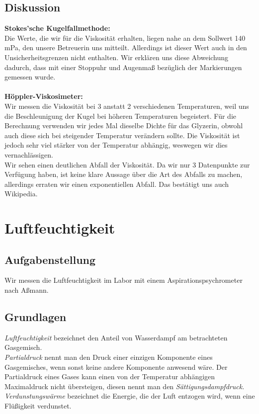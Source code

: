 \documentclass{article}
\begin{document}
\subsection{Diskussion}
\textbf{Stokes'sche Kugelfallmethode:}
\\
Die Werte, die wir für die Viskosität erhalten, liegen nahe an dem Sollwert 140 mPa, den unsere Betreuerin uns mitteilt. Allerdings ist dieser Wert auch in den Unsicherheitsgrenzen nicht enthalten. Wir erklären uns diese Abweichung dadurch, dass mit einer Stoppuhr und Augenmaß bezüglich der Markierungen gemessen wurde.\\
\\
\textbf{Höppler-Viskosimeter:}\\
Wir messen die Viskosität bei 3 anstatt 2 verschiedenen Temperaturen, weil uns die Beschleunigung der Kugel bei höheren Temperaturen begeistert. Für die Berechnung verwenden wir jedes Mal dieselbe Dichte für das Glyzerin, obwohl auch diese sich bei steigender Temperatur verändern sollte. Die Viskosität ist jedoch sehr viel stärker von der Temperatur abhängig, weswegen wir dies vernachlässigen.\\
Wir sehen einen deutlichen Abfall der Viskosität. Da wir nur 3 Datenpunkte zur Verfügung haben, ist keine klare Aussage über die Art des Abfalls zu machen, allerdings erraten wir einen exponentiellen Abfall. Das bestätigt uns auch Wikipedia.\\
\section{Luftfeuchtigkeit}
\subsection{Aufgabenstellung}
Wir messen die Luftfeuchtigkeit im Labor mit einem Aspirationspsychrometer nach Aßmann.
\subsection{Grundlagen}
\textit{Luftfeuchtigkeit} bezeichnet den Anteil von Wasserdampf am betrachteten Gasgemisch. \\
\textit{Partialdruck} nennt man den Druck einer einzigen Komponente eines Gasgemisches, wenn sonst keine andere Komponente anwesend wäre. Der Partialdruck eines Gases kann einen von der Temperatur abhängigen Maximaldruck nicht übersteigen, diesen nennt man den \textit{Sättigungsdampfdruck.}	\\
\textit{Verdunstungswärme} bezeichnet die Energie, die der Luft entzogen wird, wenn eine Flüßigkeit verdunstet. \\
\end{document}
